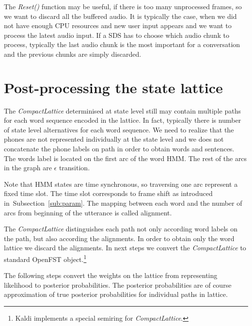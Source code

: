 The {\it Reset()} function may be useful, if there is too many unprocessed frames,
so we want to discard all the buffered audio. It is typically the case,
when we did not have enough CPU resources and new user input appears and we want to process
the latest audio input. If a \acl{SDS} has to choose which audio chunk to process, typically the last audio
chunk is the most important for a conversation and the previous chunks are simply discarded.


\section{Post-processing the state lattice}
\label{sec:postprocess}
The {\it CompactLattice}\/ determinised at state level still may contain
multiple paths for each word sequence encoded in the lattice.
In fact, typically there is number of state level alternatives for each word sequence.
We need to realize that the phones are not represented individually at the state level
and we does not concatenate the phone labels on path in order to obtain words and sentences.
The words label is located on the first arc of the word \ac{HMM}. 
The rest of the arcs in the graph are $\epsilon$ transition.

Note that \ac{HMM} states are time synchronous, so traversing one arc represent a fixed time slot.
The time slot corresponds to frame shift as introduced in~Subsection~\ref{sub:param}.
The mapping between each word and the number of arcs from beginning of the utterance is called
alignment.

The {\it CompactLattice}\/ distinguishes each path not only according word labels on the path,
but also according the alignments.
In order to obtain only the word lattice we discard the alignments.
In next steps we convert the {\it CompactLattice}\/ to standard OpenFST object.\footnote{Kaldi implements a special semiring for {\it CompactLattice}\cite{povey2012generating}.}  

The following steps convert the weights on the lattice from representing likelihood
to posterior probabilities. The posterior probabilities are of course approximation of
true posterior probabilities for individual paths in lattice. 


